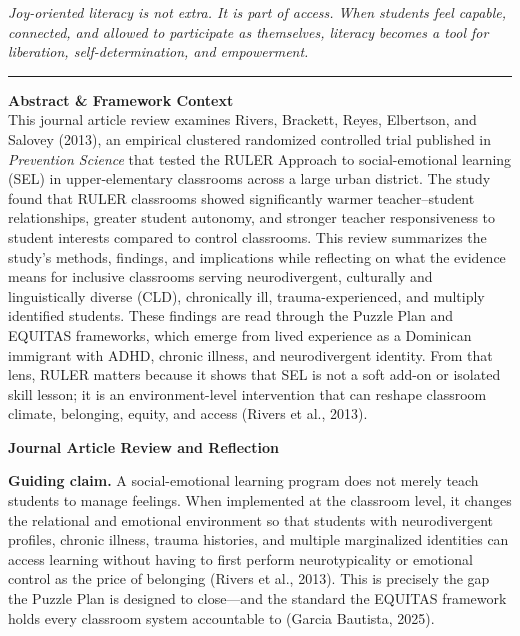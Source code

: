 \documentclass[11pt]{article}
\begin{document}
\begin{titlepage}
\vspace{0.12in}

\begin{center}
\begin{minipage}{0.92\textwidth}
\centering\footnotesize
\itshape
Joy-oriented literacy is not extra. It is part of access. When students feel capable, connected, and allowed to participate as themselves, literacy becomes a tool for liberation, self-determination, and empowerment.
{\color{PrimaryRed}\rule{4in}{0.5pt}}
\end{minipage}
\end{center}

\begin{center}
\begin{minipage}{1.0\textwidth}
\textbf{Abstract \& Framework Context}\\[-0.03in]
This journal article review examines Rivers, Brackett, Reyes, Elbertson, and Salovey (2013), an empirical clustered randomized controlled trial published in \textit{Prevention Science} that tested the RULER Approach to social-emotional learning (SEL) in upper-elementary classrooms across a large urban district. The study found that RULER classrooms showed significantly warmer teacher--student relationships, greater student autonomy, and stronger teacher responsiveness to student interests compared to control classrooms. This review summarizes the study's methods, findings, and implications while reflecting on what the evidence means for inclusive classrooms serving neurodivergent, culturally and linguistically diverse (CLD), chronically ill, trauma-experienced, and multiply identified students. These findings are read through the Puzzle Plan and EQUITAS frameworks, which emerge from lived experience as a Dominican immigrant with ADHD, chronic illness, and neurodivergent identity. From that lens, RULER matters because it shows that SEL is not a soft add-on or isolated skill lesson; it is an environment-level intervention that can reshape classroom climate, belonging, equity, and access (Rivers et al., 2013).
\end{minipage}
\end{center}

\restoregeometry
\end{titlepage}
\clearpage

{\LARGE\bfseries\color{PrimaryRed} Journal Article Review and Reflection\par}

\begin{ReflectionBox}
\textbf{Guiding claim.} A social-emotional learning program does not merely teach students to manage feelings. When implemented at the classroom level, it changes the relational and emotional environment so that students with neurodivergent profiles, chronic illness, trauma histories, and multiple marginalized identities can access learning without having to first perform neurotypicality or emotional control as the price of belonging (Rivers et al., 2013). This is precisely the gap the Puzzle Plan is designed to close---and the standard the EQUITAS framework holds every classroom system accountable to (Garcia Bautista, 2025).
\end{ReflectionBox}
\end{document}
